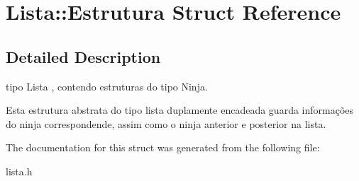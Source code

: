 \hypertarget{structLista_1_1Estrutura}{}\section{Lista\+:\+:Estrutura Struct Reference}
\label{structLista_1_1Estrutura}


\subsection{Detailed Description}
tipo Lista , contendo estruturas do tipo Ninja.

Esta estrutura abstrata do tipo lista duplamente encadeada guarda informações do ninja correspondende, assim como o ninja anterior e posterior na lista. 

The documentation for this struct was generated from the following file\+:\begin{DoxyCompactItemize}
\item 
lista.\+h\end{DoxyCompactItemize}
